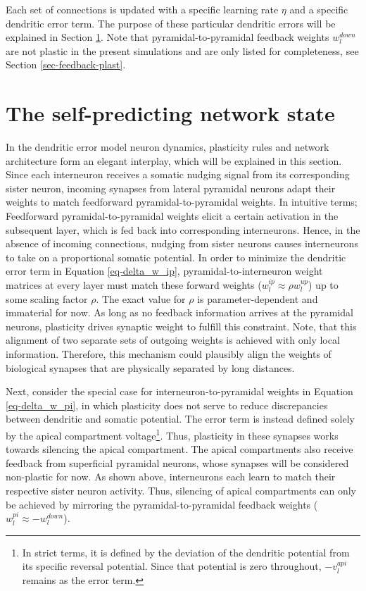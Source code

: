 Each set of connections is updated with a specific learning rate $\eta$ and a specific dendritic error term. The purpose
of these particular dendritic errors will be explained in Section \ref{sec-selfpred}. Note that pyramidal-to-pyramidal
feedback weights $w_l^{down}$ are not plastic in the present simulations and are only listed for completeness, see
Section \ref{sec-feedback-plast}.

\section{The self-predicting network state}\label{sec-selfpred}

In the dendritic error model neuron dynamics, plasticity rules and network architecture form an elegant interplay, which
will be explained in this section. Since each interneuron receives a somatic nudging signal from its corresponding
sister neuron, incoming synapses from lateral pyramidal neurons adapt their weights to match feedforward
pyramidal-to-pyramidal weights. In intuitive terms; Feedforward pyramidal-to-pyramidal weights elicit a certain
activation in the subsequent layer, which is fed back into corresponding interneurons. Hence, in the absence of incoming
connections, nudging from sister neurons causes interneurons to take on a proportional somatic potential. In order to
minimize the dendritic error term in Equation \ref{eq-delta_w_ip}, pyramidal-to-interneuron weight matrices at every
layer must match these forward weights ($w_l^{ip} \approx \rho w_l^{up}$) up to some scaling factor $\rho$. The exact
value for $\rho$ is parameter-dependent and immaterial for now. As long as no feedback information arrives at the
pyramidal neurons, plasticity drives synaptic weight to fulfill this constraint. Note, that this alignment of two
separate sets of outgoing weights is achieved with only local information. Therefore, this mechanism could plausibly
align the weights of biological synapses that are physically separated by long distances. \newline

Next, consider the special case for interneuron-to-pyramidal weights in Equation \ref{eq-delta_w_pi}, in which
plasticity does not serve to reduce discrepancies between dendritic and somatic potential. The error term is instead
defined solely by the apical compartment voltage\footnote{In strict terms, it is defined by the deviation of the
dendritic potential from its specific reversal potential. Since that potential is zero throughout, $- v_l^{api}$ remains
as the error term.}. Thus, plasticity in these synapses works towards silencing the apical compartment. The apical
compartments also receive feedback from superficial pyramidal neurons, whose synapses will be considered non-plastic for
now. As shown above, interneurons each learn to match their respective sister neuron activity. Thus, silencing of apical
compartments can only be achieved by mirroring the pyramidal-to-pyramidal feedback weights ($w_l^{pi} \approx
-w_l^{down}$).\newline

